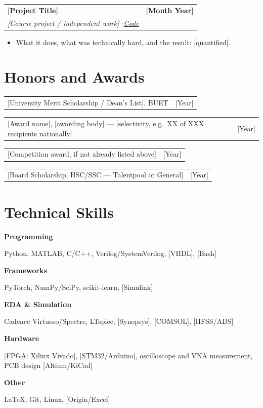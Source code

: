 \documentclass[11pt,letterpaper]{article}   %
\makeatletter
\newcommand{\entry}[4]{%
  \vspace{3pt}%
  \noindent\begin{tabularx}{\textwidth}{@{}X r@{}}
    \textbf{#1} & \textbf{#2}\\
    \textit{\textcolor{subtle}{#3}} & \textit{\textcolor{subtle}{#4}}\\
  \end{tabularx}%
  \vspace{-4pt}%
}
\newcommand{\lineentry}[2]{%
  \noindent\begin{tabularx}{\textwidth}{@{}X r@{}}
    #1 & #2\\
  \end{tabularx}%
}
\newcommand{\skillrow}[2]{%
  \noindent\parbox[t]{0.21\textwidth}{\textbf{#1}}%
  \parbox[t]{0.78\textwidth}{#2}\par\vspace{2.5pt}%
}
\makeatother
\begin{document}
\entry{[Project Title]}{[Month Year]}
      {[Course project / independent work] \quad$\cdot$\quad \href{https://github.com/yourusername/repo}{Code}}{}
\begin{itemize}
  \item What it does, what was technically hard, and the result: [quantified].
\end{itemize}

\section{Honors and Awards}
\lineentry{[University Merit Scholarship / Dean's List], BUET \hfill}{[Year]}
\lineentry{[Award name], [awarding body] --- [selectivity, e.g.\ XX of XXX recipients nationally] \hfill}{[Year]}
\lineentry{[Competition award, if not already listed above] \hfill}{[Year]}
\lineentry{[Board Scholarship, HSC/SSC — Talentpool or General] \hfill}{[Year]}

\section{Technical Skills}
\skillrow{Programming}{Python, MATLAB, C/C++, Verilog/SystemVerilog, [VHDL], [Bash]}
\skillrow{Frameworks}{PyTorch, NumPy/SciPy, scikit-learn, [Simulink]}
\skillrow{EDA \& Simulation}{Cadence Virtuoso/Spectre, LTspice, [Synopsys], [COMSOL], [HFSS/ADS]}
\skillrow{Hardware}{[FPGA: Xilinx Vivado], [STM32/Arduino], oscilloscope and VNA measurement, PCB design [Altium/KiCad]}
\skillrow{Other}{\LaTeX, Git, Linux, [Origin/Excel]}

\end{document}
